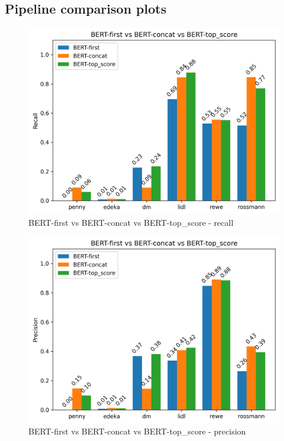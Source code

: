 \documentclass[licencjacka,en]{pracamgr}
\begin{document}
\begin{appendices}
\chapter{Pipeline comparison plots} \label{app:pipeline_comp}
\begin{figure}[ht]
    \centering
    \includegraphics[width=0.8\linewidth]{bachelor_images/benchmark/berts_recall.png}
    \caption{BERT-first vs BERT-concat vs BERT-top\_score - recall}
    \label{fig:berts_recall}
\end{figure}

\begin{figure}[ht]
    \centering
    \includegraphics[width=0.8\linewidth]{bachelor_images/benchmark/berts_precision.png}
    \caption{BERT-first vs BERT-concat vs BERT-top\_score - precision}
    \label{fig:berts_precision}
\end{figure}


\end{appendices}
\end{document}
